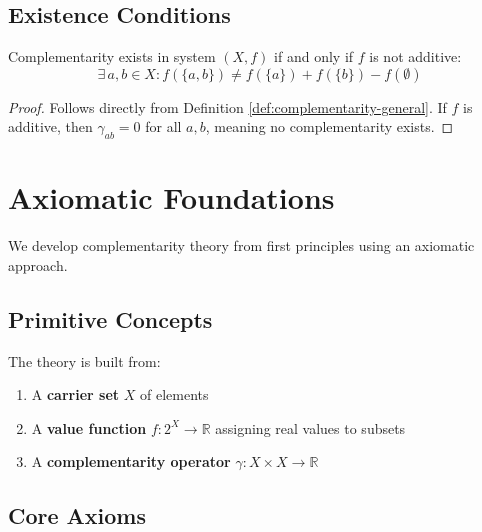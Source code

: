 \subsection{Existence Conditions}

\begin{theorem}
\label{thm:existence}
Complementarity exists in system $(X, f)$ if and only if $f$ is not additive:
\begin{equation}
\exists \, a, b \in X : f(\{a, b\}) \neq f(\{a\}) + f(\{b\}) - f(\emptyset)
\end{equation}
\end{theorem}

\begin{proof}
Follows directly from Definition \ref{def:complementarity-general}. If $f$ is additive, then $\gamma_{ab} = 0$ for all $a, b$, meaning no complementarity exists.
\end{proof}

\section{Axiomatic Foundations}
\label{sec:axioms}

We develop complementarity theory from first principles using an axiomatic approach.

\subsection{Primitive Concepts}

\begin{definition}[Primitives]
The theory is built from:
\begin{enumerate}
    \item A \textbf{carrier set} $X$ of elements
    \item A \textbf{value function} $f: 2^X \to \mathbb{R}$ assigning real values to subsets
    \item A \textbf{complementarity operator} $\gamma: X \times X \to \mathbb{R}$
\end{enumerate}
\end{definition}

\subsection{Core Axioms}

